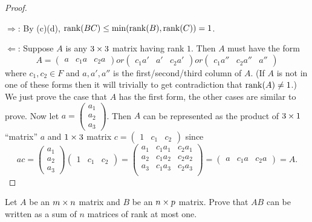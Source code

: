\begin{proof} \ 

\(\Longrightarrow\): By (c)(d), \(\mathrm{rank}(BC) \le \min(\mathrm{rank}(B), \mathrm{rank}(C)) = 1\).

\(\Longleftarrow\): Suppose \(A\) is any \(3 \times 3\) matrix having rank \(1\).
Then \(A\) must have the form
\[
    A = \begin{pmatrix} a & c_1 a & c_2 a \end{pmatrix} or \begin{pmatrix} c_1 a' & a' & c_2 a' \end{pmatrix} or \begin{pmatrix} c_1 a'' & c_2 a'' & a'' \end{pmatrix}
\]
where \(c_1, c_2 \in F\) and \(a, a', a''\) is the first/second/third column of \(A\).
(If \(A\) is not in one of these forms then it will trivially to get contradiction that \(\mathrm{rank}(A) \ne 1\).)
We just prove the case that \(A\) has the first form, the other cases are similar to prove.
Now let \(a = \begin{pmatrix} a_1 \\ a_2 \\ a_3 \end{pmatrix}\).
Then \(A\) can be represented as the product of \(3 \times 1\) ``matrix'' \(a\) and \(1 \times 3\) matrix \(c = \begin{pmatrix} 1 & c_1 & c_2 \end{pmatrix}\) since
\[
    a c = \begin{pmatrix} a_1 \\ a_2 \\ a_3 \end{pmatrix} \begin{pmatrix} 1 & c_1 & c_2 \end{pmatrix}
    = \begin{pmatrix}
        a_1 & c_1 a_1 & c_2 a_1 \\
        a_2 & c_1 a_2 & c_2 a_2 \\
        a_3 & c_1 a_3 & c_2 a_3 \\
    \end{pmatrix}
    = \begin{pmatrix} a & c_1 a & c_2 a \end{pmatrix} = A.
\]
\end{proof}

\begin{exercise} \label{exercise 3.2.18}
Let \(A\) be an \(m \times n\) matrix and \(B\) be an \(n \times p\) matrix.
Prove that \(AB\) can be written as a sum of \(n\) matrices of rank at most one.
\end{exercise}

